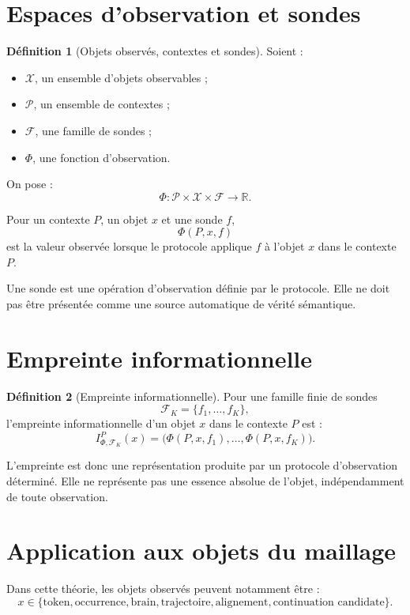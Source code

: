 \documentclass[11pt,a4paper]{report}
\theoremstyle{definition}
\newtheorem{definition}{Définition}[chapter]
\theoremstyle{plain}
\theoremstyle{remark}
\newcommand{\R}{\mathbb{R}}
\newcommand{\X}{\mathcal{X}}
\newcommand{\F}{\mathcal{F}}
\begin{document}
\section{Espaces d'observation et sondes}

\begin{definition}[Objets observés, contextes et sondes]
Soient :
\begin{itemize}
  \item \(\X\), un ensemble d'objets observables ;
  \item \(\mathcal P\), un ensemble de contextes ;
  \item \(\F\), une famille de sondes ;
  \item \(\Phi\), une fonction d'observation.
\end{itemize}

On pose :
\[
\Phi:\mathcal P\times\X\times\F\longrightarrow\R.
\]

Pour un contexte \(P\), un objet \(x\) et une sonde \(f\),
\[
\Phi(P,x,f)
\]
est la valeur observée lorsque le protocole applique \(f\) à
l'objet \(x\) dans le contexte \(P\).
\end{definition}

Une sonde est une opération d'observation définie par le
protocole. Elle ne doit pas être présentée comme une source
automatique de vérité sémantique.

\section{Empreinte informationnelle}

\begin{definition}[Empreinte informationnelle]
Pour une famille finie de sondes
\[
\F_K=\{f_1,\ldots,f_K\},
\]
l'empreinte informationnelle d'un objet \(x\) dans le contexte
\(P\) est :
\[
I_{\Phi,\F_K}^{P}(x)
=
\bigl(
\Phi(P,x,f_1),\ldots,\Phi(P,x,f_K)
\bigr).
\]
\end{definition}

L'empreinte est donc une représentation produite par un protocole
d'observation déterminé. Elle ne représente pas une essence
absolue de l'objet, indépendamment de toute observation.

\section{Application aux objets du maillage}

Dans cette théorie, les objets observés peuvent notamment être :
\[
x\in
\{
\text{token},
\text{occurrence},
\text{brain},
\text{trajectoire},
\text{alignement},
\text{continuation candidate}
\}.
\]
\end{document}

